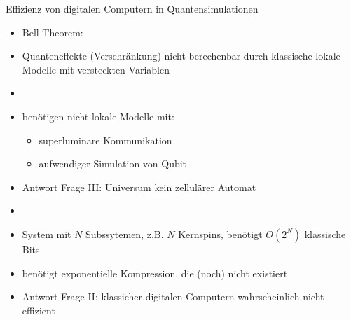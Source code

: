 \documentclass[aspectratio=1610, 9pt]{beamer}
\begin{document}
\begin{frame}{Effizienz von digitalen Computern in Quantensimulationen}
  \begin{itemize}
    \item Bell Theorem:
    \item[] Quanteneffekte (Verschränkung) nicht berechenbar durch klassische lokale Modelle mit versteckten Variablen
    \item[]
    \item benötigen nicht-lokale Modelle mit:
    \begin{itemize}
      \item superluminare Kommunikation
      \item aufwendiger Simulation von Qubit
    \end{itemize}
    \item[\rightarrow] Antwort Frage III: Universum kein zellulärer Automat
    \item[]
    \item System mit $N$ Subssytemen, z.B. $N$ Kernspins, benötigt $O(2^N)$ klassische Bits
    \item benötigt exponentielle Kompression, die (noch) nicht existiert
    \item[\rightarrow] Antwort Frage II: klassicher digitalen Computern wahrscheinlich nicht effizient
  \end{itemize}
\end{frame}
\end{document}
